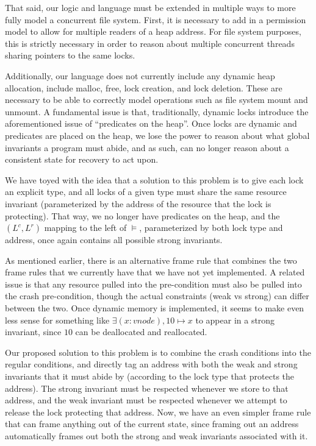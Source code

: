 That said, our logic and language must be extended in multiple ways to more
fully model a concurrent file system. First, it is necessary to add in a
permission model to allow for multiple readers of a heap address.  For file
system purposes, this is strictly necessary in order to reason about multiple
concurrent threads sharing pointers to the same locks.

Additionally, our language does not currently include any dynamic heap
allocation, include malloc, free, lock creation, and lock deletion. These are
necessary to be able to correctly model operations such as file system mount and
unmount. A fundamental issue is that, traditionally, dynamic locks introduce the
aforementioned issue of ``predicates on the heap''. Once locks are dynamic and
predicates are placed on the heap, we lose the power to reason about what global
invariants a program must abide, and as such, can no longer reason about a
consistent state for recovery to act upon.

We have toyed with the idea that a solution to this problem is to give each lock
an explicit type, and all locks of a given type must share the same resource
invariant (parameterized by the address of the resource that the lock is
protecting). That way, we no longer have predicates on the heap, and the
$(L^c,L^r)$ mapping to the left of $\vDash$, parameterized by both lock type and
address, once again contains all possible strong invariants.

As mentioned earlier, there is an alternative frame rule that combines the two
frame rules that we currently have that we have not yet implemented. A related
issue is that any resource pulled into the pre-condition must also be pulled
into the crash pre-condition, though the actual constraints (weak vs strong)
can differ between the two. Once dynamic memory is implemented, it seems to make
even less sense for something like $\exists (x:vnode), 10\mapsto x$ to appear in
a strong invariant, since $10$ can be deallocated and reallocated.

Our proposed solution to this problem is to combine the crash conditions into
the regular conditions, and directly tag an address with both the weak and
strong invariants that it must abide by (according to the lock type that
protects the address). The strong invariant must be respected whenever we store
to that address, and the weak invariant must be respected whenever we attempt to
release the lock protecting that address. Now, we have an even simpler frame
rule that can frame anything out of the current state, since framing out an
address automatically frames out both the strong and weak invariants associated
with it.

